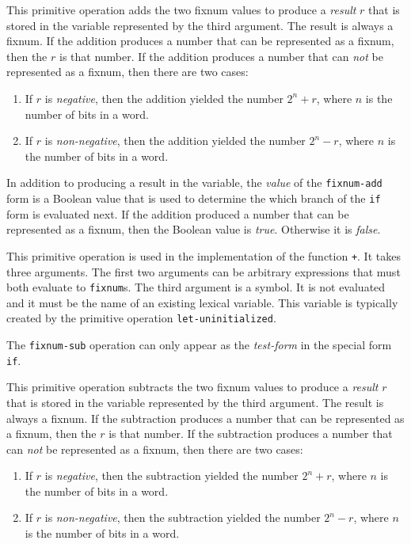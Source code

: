 This primitive operation adds the two fixnum values to produce a
\emph{result} $r$ that is stored in the variable represented by the
third argument.  The result is always a fixnum.  If the addition
produces a number that can be represented as a fixnum, then the $r$
is that number.  If the addition produces a number that can \emph{not}
be represented as a fixnum, then there are two cases:

\begin{enumerate}
\item If $r$ is \emph{negative}, then the addition yielded the number
  $2^n + r$, where $n$ is the number of bits in a word.
\item If $r$ is \emph{non-negative}, then the addition yielded the
  number $2^n - r$, where $n$ is the number of bits in a word.
\end{enumerate}

In addition to producing a result in the variable, the \emph{value} of
the \texttt{fixnum-add} form is a Boolean value that is used to
determine the which branch of the \texttt{if} form is evaluated next.
If the addition produced a number that can be represented as a fixnum,
then the Boolean value is \emph{true}.  Otherwise it is \emph{false}.


This primitive operation is used in the implementation of the
\commonlisp{} function \texttt{+}.  It takes three arguments.  The
first two arguments can be arbitrary expressions that must both
evaluate to \texttt{fixnum}s.   The third argument is a symbol.  It is
not evaluated and it must be the name of an existing lexical
variable.  This variable is typically created by the primitive
operation \texttt{let-uninitialized}.

The \texttt{fixnum-sub} operation can only appear as the
\emph{test-form} in the special form \texttt{if}.

This primitive operation subtracts the two fixnum values to produce a
\emph{result} $r$ that is stored in the variable represented by the
third argument.  The result is always a fixnum.  If the subtraction
produces a number that can be represented as a fixnum, then the $r$ is
that number.  If the subtraction produces a number that can \emph{not}
be represented as a fixnum, then there are two cases:

\begin{enumerate}
\item If $r$ is \emph{negative}, then the subtraction yielded the
  number $2^n + r$, where $n$ is the number of bits in a word.
\item If $r$ is \emph{non-negative}, then the subtraction yielded the
  number $2^n - r$, where $n$ is the number of bits in a word.
\end{enumerate}

